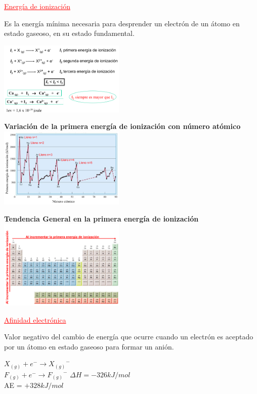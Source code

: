         \begin{center} \textcolor{red}{\underline{Energía de ionización}} \end{center}
            \indent Es la energía mínima necesaria para desprender un electrón de un átomo en estado gaseoso, en su estado fundamental.
            \begin{center} \includegraphics[width=6cm]{./imagenes/energiaDeIonizacion.png} \end{center}
            \begin{center} \textbf{Variación de la primera energía de ionización con número atómico} \\[10pt] \includegraphics[width=6cm]{./imagenes/energiaDeIonizacionVSNumeroAtomico.png} \end{center}

            \begin{center} \textbf{Tendencia General en la primera energía de ionización} \\[10pt] \includegraphics[width=6cm]{./imagenes/tendenciaPrimeraEnergiaDeIonizacion.png} \end{center}

        \begin{center} \textcolor{red}{\underline{Afinidad electrónica}} \end{center}
            \indent Valor negativo del cambio de energía que ocurre cuando un electrón es aceptado por un átomo en estado gaseoso para formar un anión.
            \begin{center}
                $X_{(g)} + e^- \rightarrow {X_{(g)}}^-$ \\[10pt]
                $F_{(g)} + e^- \rightarrow {F_{(g)}}^-$ $\Delta H = -326 kJ/mol$ \\
                AE = $+ 328 kJ/mol$ \\ 
            \end{center}

